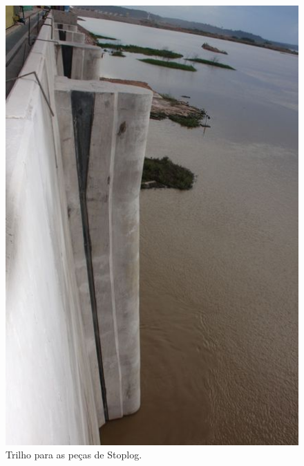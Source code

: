 \begin{figure}[h!]
    \centering \includegraphics[scale=0.6]{figs/jirau/jirau_16}
    \caption{Trilho para as peças de Stoplog.}
    \label{fig:jirau16}
\end{figure}

